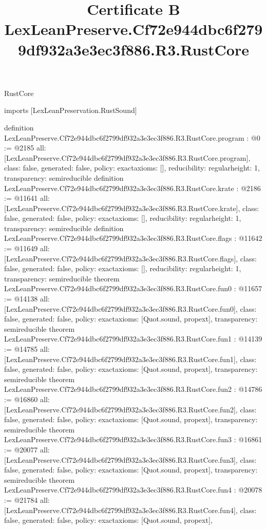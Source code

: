 \begin{lexlean}{RustCore}
\title{Certificate B LexLeanPreserve.Cf72e944dbc6f2799df932a3e3ec3f886.R3.RustCore}
\begin{coremodule}
imports [LexLeanPreservation.RustSound]

definition LexLeanPreserve.Cf72e944dbc6f2799df932a3e3ec3f886.R3.RustCore.program : @0 := @2185 {
  all: [LexLeanPreserve.Cf72e944dbc6f2799df932a3e3ec3f886.R3.RustCore.program],
  class: false,
  generated: false,
  policy: exact{axioms: []},
  reducibility: regular{height: 1},
  transparency: semireducible
}
definition LexLeanPreserve.Cf72e944dbc6f2799df932a3e3ec3f886.R3.RustCore.krate : @2186 := @11641 {
  all: [LexLeanPreserve.Cf72e944dbc6f2799df932a3e3ec3f886.R3.RustCore.krate],
  class: false,
  generated: false,
  policy: exact{axioms: []},
  reducibility: regular{height: 1},
  transparency: semireducible
}
definition LexLeanPreserve.Cf72e944dbc6f2799df932a3e3ec3f886.R3.RustCore.flags : @11642 := @11649 {
  all: [LexLeanPreserve.Cf72e944dbc6f2799df932a3e3ec3f886.R3.RustCore.flags],
  class: false,
  generated: false,
  policy: exact{axioms: []},
  reducibility: regular{height: 1},
  transparency: semireducible
}
theorem LexLeanPreserve.Cf72e944dbc6f2799df932a3e3ec3f886.R3.RustCore.fun0 : @11657 := @14138 {
  all: [LexLeanPreserve.Cf72e944dbc6f2799df932a3e3ec3f886.R3.RustCore.fun0],
  class: false,
  generated: false,
  policy: exact{axioms: [Quot.sound, propext]},
  transparency: semireducible
}
theorem LexLeanPreserve.Cf72e944dbc6f2799df932a3e3ec3f886.R3.RustCore.fun1 : @14139 := @14785 {
  all: [LexLeanPreserve.Cf72e944dbc6f2799df932a3e3ec3f886.R3.RustCore.fun1],
  class: false,
  generated: false,
  policy: exact{axioms: [Quot.sound, propext]},
  transparency: semireducible
}
theorem LexLeanPreserve.Cf72e944dbc6f2799df932a3e3ec3f886.R3.RustCore.fun2 : @14786 := @16860 {
  all: [LexLeanPreserve.Cf72e944dbc6f2799df932a3e3ec3f886.R3.RustCore.fun2],
  class: false,
  generated: false,
  policy: exact{axioms: [Quot.sound, propext]},
  transparency: semireducible
}
theorem LexLeanPreserve.Cf72e944dbc6f2799df932a3e3ec3f886.R3.RustCore.fun3 : @16861 := @20077 {
  all: [LexLeanPreserve.Cf72e944dbc6f2799df932a3e3ec3f886.R3.RustCore.fun3],
  class: false,
  generated: false,
  policy: exact{axioms: [Quot.sound, propext]},
  transparency: semireducible
}
theorem LexLeanPreserve.Cf72e944dbc6f2799df932a3e3ec3f886.R3.RustCore.fun4 : @20078 := @21784 {
  all: [LexLeanPreserve.Cf72e944dbc6f2799df932a3e3ec3f886.R3.RustCore.fun4],
  class: false,
  generated: false,
  policy: exact{axioms: [Quot.sound, propext]},
}
\end{coremodule}
\end{lexlean}
